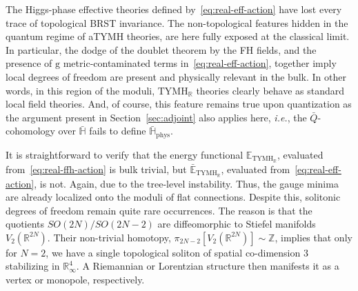 \documentclass[../main.tex]{subfiles}
\begin{document}
The Higgs-phase effective theories defined by~\eqref{eq:real-eff-action} have lost every trace of topological BRST invariance. The non-topological features hidden in the quantum regime of aTYMH theories, are here fully exposed at the classical limit. In particular, the dodge of the doublet theorem by the FH fields, and the presence of $\mathrm{g}$ metric-contaminated terms in~\eqref{eq:real-eff-action}, together imply local degrees of freedom are present and physically relevant in the bulk. In other words, in this region of the moduli, $\text{TYMH}_{\mathbb{R}}$ theories clearly behave as standard local field theories. And, of course, this feature remains true upon quantization as the argument present in Section~\ref{sec:adjoint} also applies here, \textit{i.e.}, the $\bar{Q}$-cohomology over $\bar{\mathbb{H}}$ fails to define $\bar{\mathbb{H}}_{\text{phys}}$.

It is straightforward to verify that the energy functional $\mathbb{E}_{\text{TYMH}_{\mathbb{R}}}$, evaluated from~\eqref{eq:real-ffh-action} is bulk trivial, but $\bar{\mathbb{E}}_{\text{TYMH}_{\mathbb{R}}}$, evaluated from~\eqref{eq:real-eff-action}, is not. Again, due to the tree-level instability. Thus, the gauge minima are already localized onto the moduli of flat connections. Despite this, solitonic degrees of freedom remain quite rare occurrences. The reason is that the quotients $SO(2N)/SO(2N-2)$ are diffeomorphic to Stiefel manifolds $V_2 (\mathbb{R}^{2N})$. Their non-trivial homotopy, $\pi_{2N-2} [ V_2 ( \mathbb{R}^{2N})] \sim \mathbb{Z} $, implies that only for $N=2$, we have a single topological soliton of spatial co-dimension 3 stabilizing in ${\mathbb{R}}_{\infty}^{4}$. A Riemannian or Lorentzian structure then manifests it as a vertex or monopole, respectively.
\end{document}
